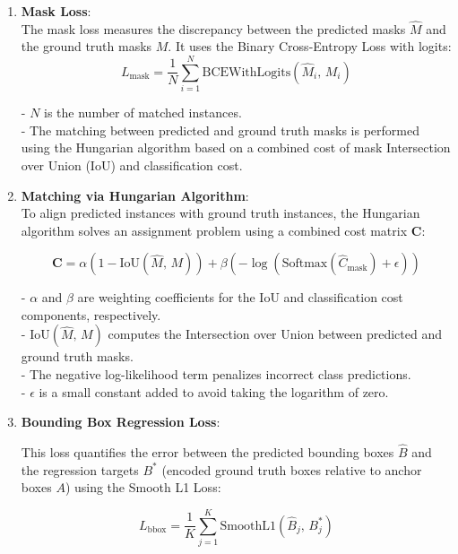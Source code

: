\vspace{1.5cm}

\begin{enumerate}
    \item \textbf{Mask Loss}: \\
    The mask loss measures the discrepancy between the predicted masks \( \hat{M} \) and the ground truth masks \( M \). It uses the Binary Cross-Entropy Loss with logits:
    \[
    L_{\text{mask}} = \frac{1}{N} \sum_{i=1}^{N} \text{BCEWithLogits}\left( \hat{M}_i, \, M_i \right)
    \]

    - \( N \) is the number of matched instances. \\
    - The matching between predicted and ground truth masks is performed using the Hungarian algorithm based on a combined cost of mask Intersection over Union (IoU) 
    and classification cost.
    \newpage

    \item \textbf{Matching via Hungarian Algorithm}: \\

    To align predicted instances with ground truth instances, the Hungarian algorithm solves an assignment problem using a combined cost matrix \( \mathbf{C} \):
    
    \[
    \mathbf{C} = \alpha \left( 1 - \text{IoU}\left( \hat{M}, \, M \right) \right) + \beta \left( -\log\left( \text{Softmax}\left( \hat{C}_{\text{mask}} \right) + \epsilon \right) \right)
    \]
    
    - \( \alpha \) and \( \beta \) are weighting coefficients for the IoU and classification cost components, respectively. \\ 
    - \( \text{IoU}\left( \hat{M}, \, M \right) \) computes the Intersection over Union between predicted and ground truth masks. \\
    - The negative log-likelihood term penalizes incorrect class predictions. \\
    - \( \epsilon \) is a small constant added to avoid taking the logarithm of zero. \\

    \item \textbf{Bounding Box Regression Loss}:

    This loss quantifies the error between the predicted bounding boxes \( \hat{B} \) and the regression targets \( B^* \) (encoded ground truth boxes relative to anchor boxes \( A \)) using the Smooth L1 Loss:
    
    \[
    L_{\text{bbox}} = \frac{1}{K} \sum_{j=1}^{K} \text{SmoothL1}\left( \hat{B}_j, \, B^*_j \right)
    \]
    

\end{enumerate}
